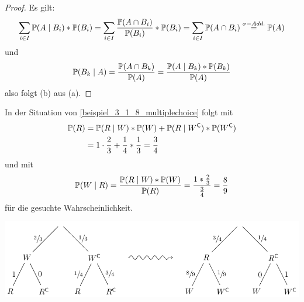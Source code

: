 \begin{proof}
	Es gilt:
	\begin{equation*}
		\sum_{i\in I} \P(A\mid B_i) * \P(B_i) = \sum_{i\in I}\frac{\P(A \cap B_i)}{\P(B_i)} * \P(B_i) = \sum_{i\in I} \P(A \cap B_i) \overset{\sigma-Add.}{=} \P(A)
	\end{equation*}
	und
	\begin{equation*}
	\P(B_k \mid A) = \frac{\P(A \cap B_k)}{\P(A)} = \frac{\P(A \mid B_k) * \P(B_k)}{\P(A)}
	\end{equation*}
	also folgt (b) aus (a).
\end{proof}

\begin{beispiel}
	In der Situation von \cref{beispiel_3_1_8_multiplechoice} folgt mit 
	\begin{equation*}
	\begin{aligned}
		\P(R) 
		&= \P(R \mid W) * \P(W) + \P(R \mid W^\complement) * \P(W^\complement) \\
		&= 1 \cdot \frac{2}{3} + \frac{1}{4} * \frac{1}{3} = \frac{3}{4}
	\end{aligned}
	\end{equation*}
	und mit 
	\begin{equation*}
		\P(W \mid R) = \frac{\P(R \mid W) * \P(W)}{\P(R)} = \frac{1 * \frac{2}{3}}{\frac{3}{4}} = \frac{8}{9}
	\end{equation*}
	für die gesuchte Wahrscheinlichkeit.
	\begin{center}
		\includegraphics{./stoch_abbildungen/baum_2.pdf}
	\end{center}
\end{beispiel}